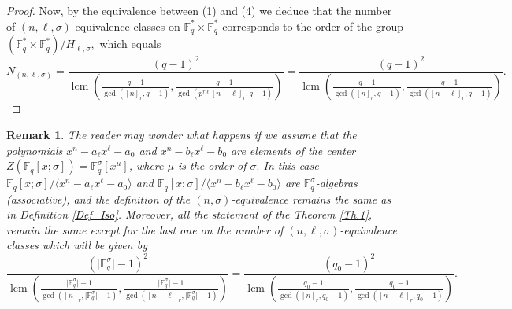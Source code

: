 \documentclass[12pt,paper]{article}
\theoremstyle{plain}
\newtheorem{remark}[theorem]{Remark}
\newcommand{\Fq}{\mathbb{F}_{q}}
\DeclareMathOperator{\lcm}{lcm}
\begin{document}
\begin{proof}
Now, by the equivalence between (1) and (4) we deduce that the number of $(n,\ell,\sigma)$-equivalence classes on $\Fq^*\times \Fq^*$  corresponds to the order of the group $ \left( \Fq^*\times \Fq^* \right)/H_{\ell,\sigma},$ which equals 
 $$ N_{(n,\ell,\sigma)}= \dfrac{ (q-1)^2}{ \lcm \left(\frac{q-1}{ \gcd([n]_r,q-1)}, \frac{q-1}{ \gcd(p^{r\ell}[n-\ell]_r,q-1)}\right)}=
 \dfrac{ (q-1)^2}{ \lcm \left(\frac{q-1}{ \gcd([n]_r,q-1)}, \frac{q-1}{ \gcd([n-\ell]_r,q-1)}\right)}
 .$$ 

\end{proof}


\begin{remark}\label{Remark_TwoSided}
The reader may wonder what happens if we assume that the polynomials
$ x^n - a_{\ell}x^{\ell} - a_0 $ and $ x^n - b_{\ell}x^{\ell} - b_0 $
are elements of the center $ Z(\mathbb{F}_q[x; \sigma]) = \mathbb{F}_q^{\sigma}[x^{\mu}] $,
where $ \mu $ is the order of $ \sigma .$ In this case  $ \Fq[x;\sigma]/\langle  x^n-a_{\ell}x^{\ell}-a_0\rangle $ and $ \Fq[x;\sigma]/\langle  x^n-b_{\ell}x^{\ell}-b_0\rangle $ are $ \Fq^{\sigma}$-algebras (associative), and the definition of the $(n,\sigma)$-equivalence remains the same as in Definition \ref{Def_Iso}.  Moreover, all the statement of the Theorem \ref{Th.1}, remain the same except for the last one on the number of $(n,\ell,\sigma)$-equivalence classes which will be given by
    $$ \dfrac{ (\vert \Fq^{\sigma}\vert -1)^2}{ \lcm \left(\frac{\vert \Fq^{\sigma}\vert-1}{ \gcd([n]_r,\vert \Fq^{\sigma}\vert-1)}, \frac{\vert \Fq^{\sigma}\vert-1}{ \gcd([n-\ell]_r,\vert \Fq^{\sigma}\vert-1)}\right)}= \dfrac{ (q_0-1)^2}{ \lcm \left(\frac{q_0-1}{ \gcd([n]_r,q_0-1)}, \frac{q_0-1}{ \gcd([n-\ell]_r,q_0-1)}\right)}
 .$$ 
\end{remark}
\end{document}
